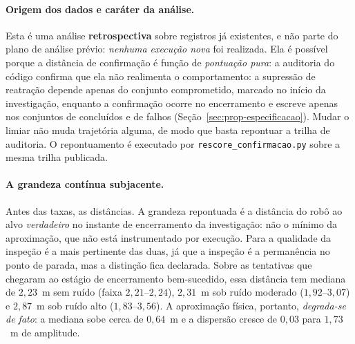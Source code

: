 \paragraph*{Origem dos dados e caráter da análise.} Esta é uma análise
\textbf{retrospectiva} sobre registros já existentes, e não parte do plano de análise
prévio: \emph{nenhuma execução nova} foi realizada. Ela é possível porque a distância
de confirmação é função de \emph{pontuação pura}: a auditoria do código confirma que
ela não realimenta o comportamento: a supressão de reatração depende apenas do conjunto
comprometido, marcado no início da investigação, enquanto a confirmação ocorre no
encerramento e escreve apenas nos conjuntos de concluídos e de falhos
(Seção~\ref{sec:prop-especificacao}). Mudar o limiar não muda trajetória alguma, de modo
que basta repontuar a trilha de auditoria. O repontuamento é executado por
\texttt{rescore\_confirmacao.py} sobre a mesma trilha publicada.

\paragraph*{A grandeza contínua subjacente.} Antes das taxas, as distâncias. A grandeza
repontuada é a distância do robô ao alvo \emph{verdadeiro} no instante de encerramento
da investigação: não o mínimo da aproximação, que não está instrumentado por
execução. Para a qualidade da inspeção é a mais pertinente das duas, já que a inspeção
é a permanência no ponto de parada, mas a distinção fica declarada. Sobre as tentativas
que chegaram ao estágio de encerramento bem-sucedido, essa distância tem mediana de
$2{,}23$~m sem ruído (faixa $2{,}21$--$2{,}24$), $2{,}31$~m sob ruído moderado
($1{,}92$--$3{,}07$) e $2{,}87$~m sob ruído alto ($1{,}83$--$3{,}56$). A aproximação
física, portanto, \emph{degrada-se de fato}: a mediana sobe cerca de $0{,}64$~m e a
dispersão cresce de $0{,}03$ para $1{,}73$~m de amplitude.

